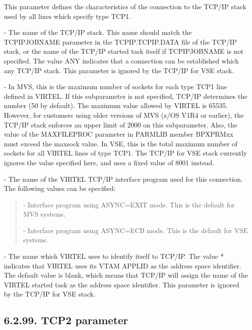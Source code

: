 \documentclass[letterpaper,10pt,english]{sphinxmanual}
\begin{document}
This parameter defines the characteristics of the connection to the TCP/IP stack used by all lines which specify type TCP1.

 - The name of the TCP/IP stack. This name should match the TCPIPJOBNAME parameter in the TCPIP.TCPIP.DATA file of the TCP/IP stack, or the name of the TCP/IP started task itself if TCPIPJOBNAME is not specified. The value ANY indicates that a connection can be established which any TCP/IP stack. This parameter is ignored by the TCP/IP for VSE stack.

 - In MVS, this is the maximum number of sockets for each type TCP1 line defined in VIRTEL. If this subparameter is not specified, TCP/IP determines the number (50 by default). The maximum value allowed by VIRTEL is 65535. However, for customers using older versions of MVS (z/OS V1R4 or earlier), the TCP/IP stack enforces an upper limit of 2000 on this subparameter. Also, the value of the MAXFILEPROC parameter in PARMLIB member BPXPRMxx must exceed the maxsock value. In VSE, this is the total maximum number of sockets for all VIRTEL lines of type TCP1. The TCP/IP for VSE stack currently ignores the value specified here, and uses a fixed value of 8001 instead.

 - The name of the VIRTEL TCP/IP interface program used for this connection. The following values can be specified:
\begin{quote}

 - Interface program using ASYNC=EXIT mode. This is the default for MVS systems.

 - Interface program using ASYNC=ECB mode. This is the default for VSE systems.
\end{quote}

 - The name which VIRTEL uses to identify itself to TCP/IP. The value * indicates that VIRTEL uses its VTAM APPLID as the address space identifier. The default value is blank, which means that TCP/IP will assign the name of the VIRTEL started task as the address space identifier. This parameter is ignored by the TCP/IP for VSE stack.


\subsection{6.2.99. TCP2 parameter}
\label{\detokenize{Installation_Guide:tcp2-parameter}}
\begin{sphinxVerbatim}[commandchars=\\\{\}]
    
\PYG{p}{[}\PYG{p}{]}\PYG{p}{[}\PYG{p}{]}\PYG{p}{[}\PYG{p}{]}\PYG{p}{[}\PYG{p}{]}
\end{sphinxVerbatim}
\end{document}

